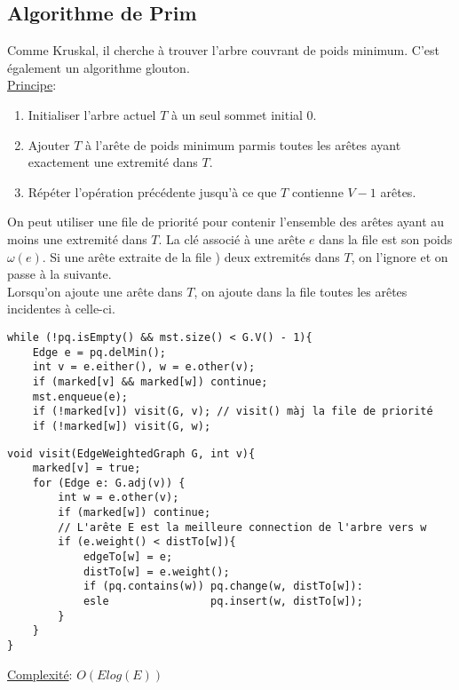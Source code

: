 \documentclass[10pt]{article}
\begin{document}
\subsection{Algorithme de Prim}
Comme Kruskal, il cherche à trouver l'arbre couvrant de poids minimum. C'est également un algorithme glouton.
\\\underline{Principe}:
\begin{enumerate}
\item Initialiser l'arbre actuel $T$ à un seul sommet initial 0.
\item Ajouter $T$ à l'arête de poids minimum parmis toutes les arêtes ayant exactement une extremité dans $T$.
\item Répéter l'opération précédente jusqu'à ce que $T$ contienne  $V - 1$ arêtes.
\end{enumerate}
On peut utiliser une file de priorité pour contenir l'ensemble des arêtes ayant au moins une extremité dans $T$.  La clé associé à une arête $e$ dans la file est son poids $\omega(e)$. Si une arête extraite de la file ) deux extremités dans $T$, on l'ignore et on passe à la suivante. 
\\Lorsqu'on ajoute une arête dans $T$, on ajoute dans la file toutes les arêtes incidentes à celle-ci.
\begin{verbatim}
while (!pq.isEmpty() && mst.size() < G.V() - 1){
	Edge e = pq.delMin();
	int v = e.either(), w = e.other(v);
	if (marked[v] && marked[w]) continue;
	mst.enqueue(e);
	if (!marked[v]) visit(G, v); // visit() màj la file de priorité
	if (!marked[w]) visit(G, w);
\end{verbatim}


\begin{verbatim}
void visit(EdgeWeightedGraph G, int v){
	marked[v] = true;
	for (Edge e: G.adj(v)) {
		int w = e.other(v);
		if (marked[w]) continue;
		// L'arête E est la meilleure connection de l'arbre vers w
		if (e.weight() < distTo[w]){ 
			edgeTo[w] = e;
			distTo[w] = e.weight();
			if (pq.contains(w)) pq.change(w, distTo[w]):
			esle				pq.insert(w, distTo[w]);				
		}
	}
}
\end{verbatim}

\underline{Complexité}: $O(Elog(E))$
\end{document}

